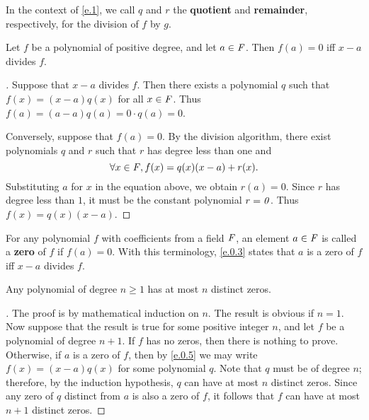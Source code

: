 \begin{defn}\label{e.0.2}
	In the context of \cref{e.1}, we call \(q\) and \(r\) the \textbf{quotient} and \textbf{remainder}, respectively, for the division of \(f\) by \(g\).
\end{defn}

\begin{cor}\label{e.0.3}
	Let \(f\) be a polynomial of positive degree, and let \(a \in \mathit{F}\).
	Then \(f(a) = 0\) iff \(x - a\) divides \(f\).
\end{cor}

\begin{proof}[]
	Suppose that \(x - a\) divides \(f\).
	Then there exists a polynomial \(q\) such that \(f(x) = (x - a) q(x)\) for all \(x \in \mathit{F}\).
	Thus \(f(a) = (a - a) q(a) = 0 \cdot q(a) = 0\).

	Conversely, suppose that \(f(a) = 0\).
	By the division algorithm, there exist polynomials \(q\) and \(r\) such that \(r\) has degree less than one and
	\[
		\forall x \in \mathit{F}, f(x) = q(x) (x - a) + r(x).
	\]
	Substituting \(a\) for \(x\) in the equation above, we obtain \(r(a) = 0\).
	Since \(r\) has degree less than \(1\), it must be the constant polynomial \(r = \mathit{0}\).
	Thus \(f(x) = q(x) (x - a)\).
\end{proof}

\begin{defn}\label{e.0.4}
	For any polynomial \(f\) with coefficients from a field \(\mathit{F}\), an element \(a \in \mathit{F}\) is called a \textbf{zero} of \(f\) if \(f(a) = 0\).
	With this terminology, \cref{e.0.3} states that \(a\) is a zero of \(f\) iff \(x - a\) divides \(f\).
\end{defn}

\begin{cor}\label{e.0.5}
	Any polynomial of degree \(n \geq 1\) has at most \(n\) distinct zeros.
\end{cor}

\begin{proof}[]
	The proof is by mathematical induction on \(n\).
	The result is obvious if \(n = 1\).
	Now suppose that the result is true for some positive integer \(n\), and let \(f\) be a polynomial of degree \(n + 1\).
	If \(f\) has no zeros, then there is nothing to prove.
	Otherwise, if \(a\) is a zero of \(f\), then by \cref{e.0.5} we may write \(f(x) = (x - a) q(x)\) for some polynomial \(q\).
	Note that \(q\) must be of degree \(n\);
	therefore, by the induction hypothesis, \(q\) can have at most \(n\) distinct zeros.
	Since any zero of \(q\) distinct from \(a\) is also a zero of \(f\), it follows that \(f\) can have at most \(n + 1\) distinct zeros.
\end{proof}

